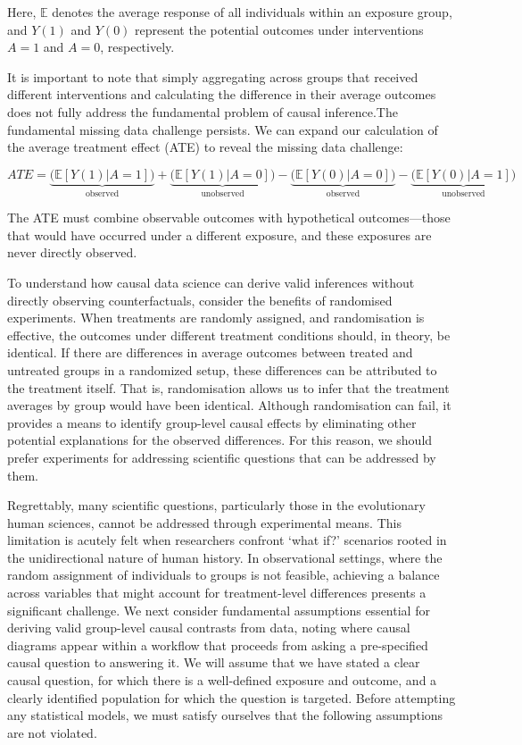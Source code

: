 \documentclass[
  singlecolumn,
  9pt]{article}
\begin{document}
Here, \(\mathbb{E}\) denotes the average response of all individuals
within an exposure group, and \(Y(1)\) and \(Y(0)\) represent the
potential outcomes under interventions \(A = 1\) and \(A = 0\),
respectively.

It is important to note that simply aggregating across groups that
received different interventions and calculating the difference in their
average outcomes does not fully address the fundamental problem of
causal inference.The fundamental missing data challenge persists. We can
expand our calculation of the average treatment effect (ATE) to reveal
the missing data challenge:

\[
ATE = \underbrace{\big(\mathbb{E}[Y(1)|A = 1]\big)}_{\text{observed}}  + \underbrace{\big(\mathbb{E}[Y(1)|A = 0]\big)}_{\text{unobserved}} - \underbrace{\big(\mathbb{E}[Y(0)|A = 0]\big)}_{\text{observed}} - \underbrace{\big(\mathbb{E}[Y(0)|A = 1]\big)}_{\text{unobserved}}
\]

The ATE must combine observable outcomes with hypothetical
outcomes---those that would have occurred under a different exposure,
and these exposures are never directly observed.

To understand how causal data science can derive valid inferences
without directly observing counterfactuals, consider the benefits of
randomised experiments. When treatments are randomly assigned, and
randomisation is effective, the outcomes under different treatment
conditions should, in theory, be identical. If there are differences in
average outcomes between treated and untreated groups in a randomized
setup, these differences can be attributed to the treatment itself. That
is, randomisation allows us to infer that the treatment averages by
group would have been identical. Although randomisation can fail, it
provides a means to identify group-level causal effects by eliminating
other potential explanations for the observed differences. For this
reason, we should prefer experiments for addressing scientific questions
that can be addressed by them.

Regrettably, many scientific questions, particularly those in the
evolutionary human sciences, cannot be addressed through experimental
means. This limitation is acutely felt when researchers confront `what
if?' scenarios rooted in the unidirectional nature of human history. In
observational settings, where the random assignment of individuals to
groups is not feasible, achieving a balance across variables that might
account for treatment-level differences presents a significant
challenge. We next consider fundamental assumptions essential for
deriving valid group-level causal contrasts from data, noting where
causal diagrams appear within a workflow that proceeds from asking a
pre-specified causal question to answering it. We will assume that we
have stated a clear causal question, for which there is a well-defined
exposure and outcome, and a clearly identified population for which the
question is targeted. Before attempting any statistical models, we must
satisfy ourselves that the following assumptions are not violated.
\end{document}
